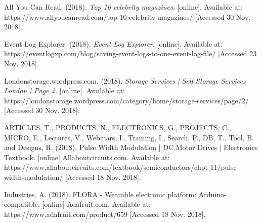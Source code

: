\documentclass[11.5pt]{article}
\begin{document}
\begin{thebibliography}{9}
All You Can Read. (2018). \textit{Top 10 celebrity magazines.} [online]. Available at: https://www.allyoucanread.com/top-10-celebrity-magazines/ [Accessed 30 Nov. 2018].

Event Log Explorer. (2018). \textit{Event Log Explorer.} [online]. Available at: https://eventlogxp.com/blog/saving-event-logs-to-one-event-log-file/ [Accessed 23 Nov. 2018].



Londonstorage.wordpress.com. (2018). \textit{Storage Services | Self Storage Services London | Page 2.} [online]. Available at: https://londonstorage.wordpress.com/category/home/storage-services/page/2/ [Accessed 30 Nov. 2018].

ARTICLES, T., PRODUCTS, N., ELECTRONICS, G., PROJECTS, C., MICRO, E., Lectures, V., Webinars, I., Training, I., Search, P., DB, T., Tool, B. and Designs, R. (2018). Pulse Width Modulation | DC Motor Drives | Electronics Textbook. [online] Allaboutcircuits.com. 
Available at: https://www.allaboutcircuits.com/textbook/semiconductors/chpt-11/pulse-width-modulation/ [Accessed 18 Nov. 2018].

Industries, A. (2018). FLORA - Wearable electronic platform: Arduino-compatible. [online] Adafruit.com. Available at: https://www.adafruit.com/product/659 [Accessed 18 Nov. 2018].





\end{thebibliography}
\end{document}
